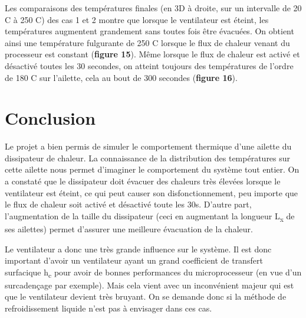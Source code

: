 \documentclass[11pt]{article} %
\begin{document}
\par Les comparaisons des températures finales (en 3D à droite, sur un intervalle de 20 \degree C à 250 \degree C)  des cas 1 et 2 montre que lorsque le ventilateur est éteint, les températures augmentent grandement sans toutes fois être évacuées. On obtient ainsi une température fulgurante de 250 \degree C lorsque le flux de chaleur venant du processeur est constant (\textbf{figure 15}). Même lorsque le flux de chaleur est activé et désactivé toutes les 30 secondes, on atteint toujours des températures de l’ordre de 180 \degree C sur l’ailette, cela au bout de 300 secondes (\textbf{figure 16}).

\section*{Conclusion}

Le projet a bien permis de simuler le comportement thermique d’une ailette du dissipateur de chaleur. La connaissance de la distribution des températures sur cette ailette nous permet d’imaginer le comportement du système tout entier. On a constaté que le dissipateur doit évacuer des chaleurs très élevées lorsque le ventilateur est éteint, ce qui peut causer son disfonctionnement, peu importe que le flux de chaleur soit activé et désactivé toute les 30s. D’autre part, l’augmentation de la taille du dissipateur (ceci en augmentant la longueur L\textsubscript x de ses ailettes) permet d’assurer une meilleure évacuation de la chaleur. 
\par Le ventilateur a donc une très grande influence sur le système. Il est donc important d’avoir un ventilateur ayant un grand coefficient de transfert surfacique h\textsubscript c pour avoir de bonnes performances du microprocesseur (en vue d’un surcadençage par exemple). Mais cela vient avec un inconvénient majeur qui est que le ventilateur devient très bruyant. On se demande donc si la méthode de refroidissement liquide n’est pas à envisager dans ces cas.
\end{document}
